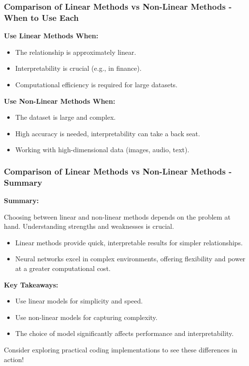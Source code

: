 \documentclass[aspectratio=169]{beamer}
\begin{document}
\begin{frame}[fragile]
    \frametitle{Comparison of Linear Methods vs Non-Linear Methods - When to Use Each}

    \textbf{Use Linear Methods When:}
    \begin{itemize}
        \item The relationship is approximately linear.
        \item Interpretability is crucial (e.g., in finance).
        \item Computational efficiency is required for large datasets.
    \end{itemize}

    \textbf{Use Non-Linear Methods When:}
    \begin{itemize}
        \item The dataset is large and complex.
        \item High accuracy is needed, interpretability can take a back seat.
        \item Working with high-dimensional data (images, audio, text).
    \end{itemize}
\end{frame}

\begin{frame}[fragile]
    \frametitle{Comparison of Linear Methods vs Non-Linear Methods - Summary}
    \textbf{Summary:}
    
    Choosing between linear and non-linear methods depends on the problem at hand. Understanding strengths and weaknesses is crucial.
    
    \begin{itemize}
        \item Linear methods provide quick, interpretable results for simpler relationships.
        \item Neural networks excel in complex environments, offering flexibility and power at a greater computational cost.
    \end{itemize}
    
    \textbf{Key Takeaways:}
    \begin{itemize}
        \item Use linear models for simplicity and speed.
        \item Use non-linear models for capturing complexity.
        \item The choice of model significantly affects performance and interpretability.
    \end{itemize}
    Consider exploring practical coding implementations to see these differences in action!
\end{frame}
\end{document}
